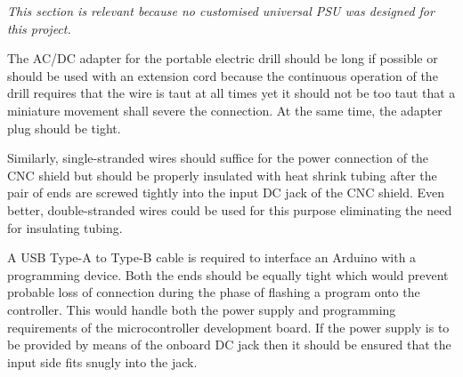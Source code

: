 \textit{This section is relevant because no customised universal PSU was designed for this project.}

The AC/DC adapter for the portable electric drill should be long if possible or should be used with an extension cord because the continuous operation of the drill requires that the wire is taut at all times yet it should not be too taut that a miniature movement shall severe the connection. At the same time, the adapter plug should be tight. \par

Similarly, single-stranded wires should suffice for the power connection of the CNC shield but should be properly insulated with heat shrink tubing after the pair of ends are screwed tightly into the input DC jack of the CNC shield. Even better, double-stranded wires could be used for this purpose eliminating the need for insulating tubing. \par

A USB Type-A to Type-B cable is required to interface an Arduino with a programming device. Both the ends should be equally tight which would prevent probable loss of connection during the phase of flashing a program onto the controller. This would handle both the power supply and programming requirements of the microcontroller development board. If the power supply is to be provided by means of the onboard DC jack then it should be ensured that the input side fits snugly into the jack.

